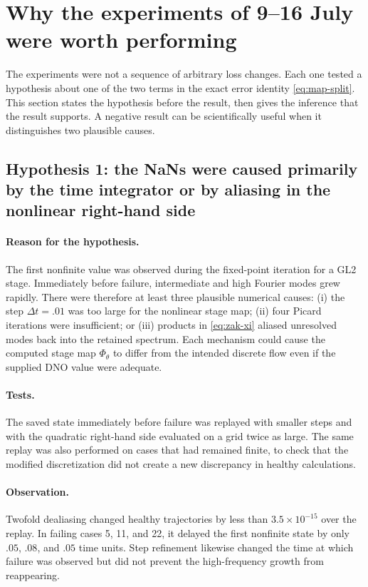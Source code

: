 \documentclass[11pt]{article}
\begin{document}
\section{Why the experiments of 9--16 July were worth performing}

The experiments were not a sequence of arbitrary loss changes.  Each one
tested a hypothesis about one of the two terms in the exact error identity
\eqref{eq:map-split}.  This section states the hypothesis before the result,
then gives the inference that the result supports.  A negative result can be
scientifically useful when it distinguishes two plausible causes.

\subsection{Hypothesis 1: the NaNs were caused primarily by the time
integrator or by aliasing in the nonlinear right-hand side}

\paragraph{Reason for the hypothesis.}
The first nonfinite value was observed during the fixed-point iteration for a
GL2 stage.  Immediately before failure, intermediate and high Fourier modes
grew rapidly.  There were therefore at least three plausible numerical causes:
(i) the step $\Delta t=.01$ was too large for the nonlinear stage map;
(ii) four Picard iterations were insufficient; or (iii) products in
\eqref{eq:zak-xi} aliased unresolved modes back into the retained spectrum.
Each mechanism could cause the computed stage map $\Phi_\theta$ to differ from
the intended discrete flow even if the supplied DNO value were adequate.

\paragraph{Tests.}
The saved state immediately before failure was replayed with smaller steps and
with the quadratic right-hand side evaluated on a grid twice as large.  The
same replay was also performed on cases that had remained finite, to check
that the modified discretization did not create a new discrepancy in healthy
calculations.

\paragraph{Observation.}
Twofold dealiasing changed healthy trajectories by less than
$3.5\times10^{-15}$ over the replay.  In failing cases 5, 11, and 22, it
delayed the first nonfinite state by only $.05$, $.08$, and $.05$ time units.
Step refinement likewise changed the time at which failure was observed but
did not prevent the high-frequency growth from reappearing.
\end{document}
